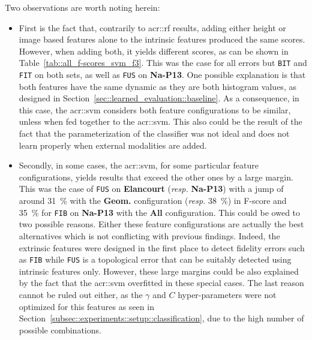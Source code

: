         Two observations are worth noting herein:
        \begin{itemize}[label=\(\blacktriangleright\)]
            \item First is the fact that, contrarily to \gls{acr::rf} results, adding either height or image based features alone to the intrinsic features produced the same scores.
                    However, when adding both, it yields different scores, as can be shown in Table~\ref{tab::all_f-scores_svm_f3}.
                    This was the case for all errors but \texttt{BIT} and \texttt{FIT} on both sets, as well as \texttt{FUS} on \textbf{Na-P13}.
                    One possible explanation is that both features have the same dynamic as they are both histogram values, as designed in Section~\ref{sec::learned_evaluation::baseline}.
                    As a consequence, in this case, the \gls{acr::svm} considers both feature configurations to be similar, unless when fed together to the \gls{acr::svm}.
                    This also could be the result of the fact that the parameterization of the classifier was not ideal and does not learn properly when external modalities are added.
            \item Secondly, in some cases, the \gls{acr::svm}, for some particular feature configurations, yields results that exceed the other ones by a large margin.
                    This was the case of \texttt{FUS} on \textbf{Elancourt} (\textit{resp.} \textbf{Na-P13}) with a jump of around \SI{31}{\percent} with the \textbf{Geom.} configuration (\textit{resp.} \SI{38}{\percent}) in F-score and \SI{35}{\percent} for \texttt{FIB} on \textbf{Na-P13} with the \textbf{All} configuration.
                    This could be owed to two possible reasons.
                    Either these feature configurations are actually the best alternatives which is not conflicting with previous findings.
                    Indeed, the extrinsic features were designed in the first place to detect fidelity errors such as \texttt{FIB} while \texttt{FUS} is a topological error that can be suitably detected using intrinsic features only.
                    However, these large margins could be also explained by the fact that the \gls{acr::svm} overfitted in these special cases.
                    The last reason cannot be ruled out either, as the \(\gamma\) and \(C\) hyper-parameters were not optimized for this features as seen in Section~\ref{subsec::experiments::setup::classification}, due to the high number of possible combinations.
            \end{itemize}
            
